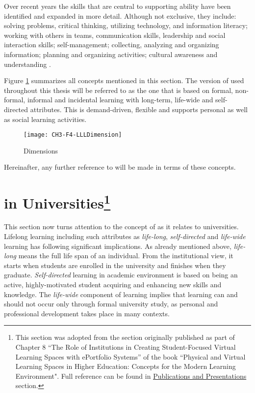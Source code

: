 Over recent years the skills that are central to supporting \LLLs ability have
been identified and expanded in more detail. Although not exclusive, they
include: solving problems, critical thinking, utilizing technology, and
information literacy; working with others in teams, communication skills,
leadership and social interaction skills; self-management; collecting, analyzing
and organizing information; planning and organizing activities; cultural
awareness and understanding \citep{Brooks2008,Heinrich2007,Otala1997,Pitman2009}. 

Figure \ref{fig:llldim} summarizes all concepts mentioned in this section.
The version of \LLLs used throughout this thesis will be referred to as the one
that is based on formal, non-formal, informal and incidental learning with
long-term, life-wide and self-directed attributes. This \LLLs is demand-driven,
flexible and supports personal as well as social learning activities.

\begin{figure}[htb]
\centering
\texttt{[image: CH3-F4-LLLDimension]}
\caption{\LLLc Dimensions}
\label{fig:llldim}
\end{figure}

\FloatBarrier

Hereinafter, any further reference to \LLLs will be made in terms of these
concepts.

\section[\LLLc in Universities]{\LLLc in Universities\footnote{This section was
adopted from the section originally published as part of Chapter 8 ``The Role of
Institutions in Creating Student-Focused Virtual Learning Spaces with ePortfolio
Systems'' of the book ``Physical and Virtual Learning Spaces in Higher
Education: Concepts for the Modern Learning Environment". Full reference can be
found in \hyperref[sec:pub]{Publications and Presentations} section.} }

\label{sec:uni}

This section now turns attention to the concept of \LLLs as it relates to
universities. Lifelong learning including such attributes as \textit{life-long},
\textit{self-directed} and \textit{life-wide} learning has following significant
implications. As already mentioned above, \textit{life-long} means the full life
span of an individual. From the institutional view, it starts when students are
enrolled in the university and finishes when they graduate.
\textit{Self-directed} learning in academic environment is based on being an
active, highly-motivated student acquiring and enhancing new skills and
knowledge. The \textit{life-wide} component of learning implies that learning
can and should not occur only through formal university study, as personal and
professional development takes place in many contexts. 


